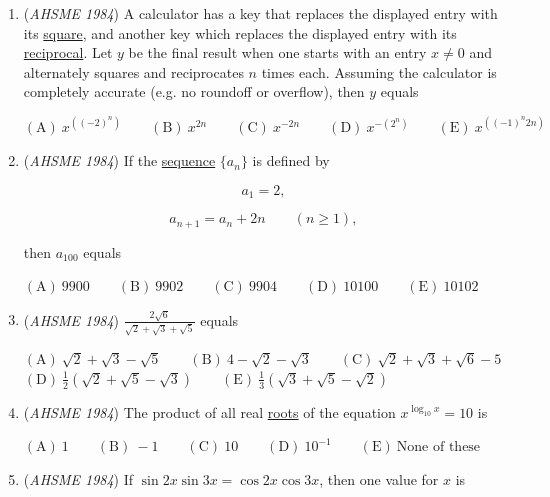 \begin{enumerate}
 $\mathrm{(A) \ }2+i \qquad \mathrm{(B) \ }2-i \qquad \mathrm{(C) \ } 1-2i \qquad \mathrm{(D) \ }{-1}+2i \qquad \mathrm{(E) \ } {-2}-i$


	\item (\textit{AHSME 1984}) A calculator has a key that replaces the displayed entry with its \href{https://artofproblemsolving.com/wiki/index.php?title=Perfect\_square}{square}, and another key which replaces the displayed entry with its \href{https://artofproblemsolving.com/wiki/index.php?title=Reciprocal}{reciprocal}. Let $y$ be the final result when one starts with an entry $x\not=0$ and alternately squares and reciprocates $n$ times each. Assuming the calculator is completely accurate (e.g. no roundoff or overflow), then $y$ equals


 $\mathrm{(A) \ }x^{((-2)^n)} \qquad \mathrm{(B) \ }x^{2n} \qquad \mathrm{(C) \ } x^{-2n} \qquad \mathrm{(D) \ }x^{-(2^n)} \qquad \mathrm{(E) \ } x^{((-1)^n2n)}$


	\item (\textit{AHSME 1984}) If the \href{https://artofproblemsolving.com/wiki/index.php?title=Sequence}{sequence} $\{a_n\}$ is defined by


 
 \[a_1=2,\]

 \[a_{n+1}=a_n+2n \qquad (n \geq 1),\]


 then $a_{100}$ equals


 $\mathrm{(A) \ }9900 \qquad \mathrm{(B) \ }9902 \qquad \mathrm{(C) \ } 9904 \qquad \mathrm{(D) \ }10100 \qquad \mathrm{(E) \ } 10102$


	\item (\textit{AHSME 1984}) $\frac{2\sqrt{6}}{\sqrt{2}+\sqrt{3}+\sqrt{5}}$ equals


 $\mathrm{(A) \ }\sqrt{2}+\sqrt{3}-\sqrt{5} \qquad \mathrm{(B) \ }4-\sqrt{2}-\sqrt{3} \qquad \mathrm{(C) \ } \sqrt{2}+\sqrt{3}+\sqrt{6}-5 \qquad$
$\mathrm{(D) \ }\frac{1}{2}(\sqrt{2}+\sqrt{5}-\sqrt{3}) \qquad \mathrm{(E) \ } \frac{1}{3}(\sqrt{3}+\sqrt{5}-\sqrt{2})$


	\item (\textit{AHSME 1984}) The product of all real \href{https://artofproblemsolving.com/wiki/index.php?title=Root\_(polynomial)}{roots} of the equation $x^{\log_{10}{x}}=10$ is


 $\mathrm{(A) \ }1 \qquad \mathrm{(B) \ }-1 \qquad \mathrm{(C) \ } 10 \qquad \mathrm{(D) \ }10^{-1} \qquad \mathrm{(E) \ } \text{None of these}$


	\item (\textit{AHSME 1984}) If $\sin{2x}\sin{3x}=\cos{2x}\cos{3x}$, then one value for $x$ is



\end{enumerate}
